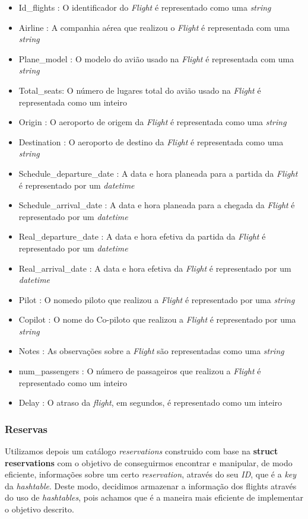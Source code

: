 \documentclass[11pt]{article}
\begin{document}
     \begin{itemize}
        \item Id_flights : O identificador do \textit{Flight} é representado como uma \textit{string}
        \item Airline : A companhia aérea que realizou o \textit{Flight} é representada com uma \textit{string}
        \item Plane_model : O modelo do avião usado na \textit{Flight} é representada com uma \textit{string}
        \item Total_seats: O número de lugares total do avião usado na \textit{Flight} é representada como um inteiro
        \item Origin : O aeroporto de origem da \textit{Flight} é representada como uma \textit{string}
        \item Destination : O aeroporto de destino da \textit{Flight} é representada como uma \textit{string}
        \item Schedule_departure_date : A data e hora planeada para a partida da \textit{Flight} é representado por um \textit{datetime}
        \item Schedule_arrival_date :  A data e hora planeada para a chegada da \textit{Flight} é representado por um \textit{datetime}
        \item Real_departure_date : A data e hora efetiva da partida da \textit{Flight} é representado por um \textit{datetime} 
        \item Real_arrival_date : A data e hora efetiva da \textit{Flight} é representado por um \textit{datetime} 
        \item Pilot : O nomedo  piloto que realizou a \textit{Flight} é representado por uma \textit{string}
        \item Copilot : O nome do Co-piloto que realizou a \textit{Flight} é representado por uma \textit{string}
        \item Notes : As observações sobre a \textit{Flight} são representadas como uma \textit{string}
        \item num_passengers : O número de passageiros que realizou a \textit{Flight} é representado como um inteiro
        \item Delay : O atraso da \textit{flight}, em segundos, é representado como um inteiro
    \end{itemize}
\subsubsection{Reservas}
    Utilizamos depois um catálogo \textit{reservations} construido
    com base na \textbf{struct reservations} com o objetivo de conseguirmos encontrar e manipular, de modo eficiente, informações sobre um certo \textit{reservation}, através do seu \textit{ID}, que é a \textit{key} da \textit{hashtable}. Deste modo, decidimos armazenar a informação dos flights através do uso de \textit{hashtables}, pois achamos que é a maneira mais eficiente de implementar o objetivo descrito.
    
\end{document}
